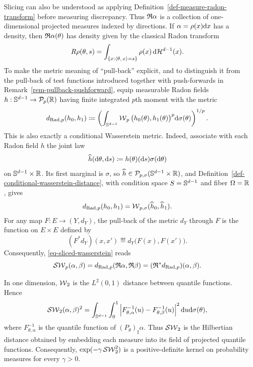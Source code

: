 	Slicing can also be understood as applying Definition~\ref{def-measure-radon-transform} before measuring discrepancy. Thus $\mathfrak R\alpha$ is a collection of one-dimensional projected measures indexed by directions. If $\alpha=\rho(x)\mathrm{d} x$ has a density, then $\mathfrak R\alpha(\theta)$ has density given by the classical Radon transform
	\[
		R\rho(\theta,s)
		=
		\int_{\{x:\langle \theta,\,x\rangle=s\}}\rho(x)\,\mathrm{d}\mathcal H^{d-1}(x).
	\]
	To make the metric meaning of ``pull-back'' explicit, and to distinguish it from the pull-back of test functions introduced together with push-forwards in Remark~\ref{rem-pullback-pushforward}, equip measurable Radon fields $h:\mathbb{S}^{d-1}\to\mathcal{P}_p(\mathbb{R})$ having finite integrated $p$th moment with the metric
	\[
		d_{\mathrm{Rad},p}(h_0,h_1)
		\coloneqq
		\left(
			\int_{\mathbb{S}^{d-1}}
			\operatorname{\mathcal{W}}_p\big(h_0(\theta),h_1(\theta)\big)^p
			\mathrm{d}\sigma(\theta)
		\right)^{1/p}.
	\]
	This is also exactly a conditional Wasserstein metric. Indeed, associate with each Radon field $h$ the joint law
	\[
		\widehat h(\mathrm{d}\theta,\mathrm{d} s)
		\coloneqq
		h(\theta)(\mathrm{d} s)\sigma(\mathrm{d}\theta)
	\]
	on $\mathbb{S}^{d-1}\times\mathbb{R}$. Its first marginal is $\sigma$, so $\widehat h\in\mathcal{P}_{p,\sigma}(\mathbb{S}^{d-1}\times\mathbb{R})$, and Definition~\ref{def-conditional-wasserstein-distance}, with condition space $S=\mathbb{S}^{d-1}$ and fiber $\Omega=\mathbb{R}$, gives
	\[
		d_{\mathrm{Rad},p}(h_0,h_1)
		=
		\operatorname{\mathcal{W}}_{p,\sigma}(\widehat h_0,\widehat h_1).
	\]
	For any map $F:E\to(Y,d_Y)$, the pull-back of the metric $d_Y$ through $F$ is the function on $E\times E$ defined by
	\[
		(F^*d_Y)(x,x')\eqdef d_Y\big(F(x),F(x')\big).
	\]
	Consequently, \eqref{eq-sliced-wasserstein} reads
	\[
		\operatorname{\mathcal{SW}}_p(\alpha,\beta)
		=
		d_{\mathrm{Rad},p}(\mathfrak R\alpha,\mathfrak R\beta)
		=
		(\mathfrak R^*d_{\mathrm{Rad},p})(\alpha,\beta).
	\]
\begin{rem}\label{rem-sliced-hilbert-embedding}
	In one dimension, $\operatorname{\mathcal{W}}_2$ is the $L^2(0,1)$ distance between quantile functions. Hence
	\[
		\operatorname{\mathcal{SW}}_2(\alpha,\beta)^2
		=
		\int_{\mathbb{S}^{d-1}}\int_0^1
		\left\lvert F_{\theta,\alpha}^{-1}(u)-F_{\theta,\beta}^{-1}(u)\right\rvert^2
		\mathrm{d} u\mathrm{d}\sigma(\theta),
	\]
	where $F_{\theta,\alpha}^{-1}$ is the quantile function of $(P_\theta)_\sharp\alpha$. Thus $\operatorname{\mathcal{SW}}_2$ is the Hilbertian distance obtained by embedding each measure into its field of projected quantile functions. Consequently, $\exp(-\gamma\operatorname{\mathcal{SW}}_2^2)$ is a positive-definite kernel on probability measures for every $\gamma>0$.
\end{rem}

